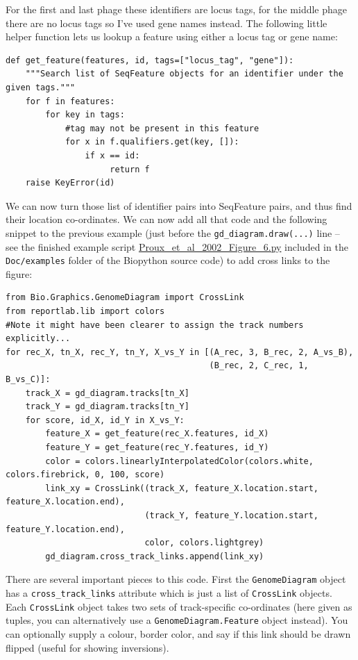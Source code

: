 \documentclass{report}
\begin{document}
For the first and last phage these identifiers are locus tags, for the middle
phage there are no locus tags so I've used gene names instead. The following
little helper function lets us lookup a feature using either a locus tag or
gene name:

\begin{verbatim}
def get_feature(features, id, tags=["locus_tag", "gene"]):
    """Search list of SeqFeature objects for an identifier under the given tags."""
    for f in features:
        for key in tags:
            #tag may not be present in this feature 
            for x in f.qualifiers.get(key, []):
                if x == id:
                     return f
    raise KeyError(id)
\end{verbatim}

We can now turn those list of identifier pairs into SeqFeature pairs, and thus
find their location co-ordinates. We can now add all that code and the following
snippet to the previous example (just before the \verb|gd_diagram.draw(...)|
line -- see the finished example script
\href{http://biopython.org/SRC/biopython/Doc/examples/Proux_et_al_2002_Figure_6.py}{Proux\_et\_al\_2002\_Figure\_6.py}
included in the \texttt{Doc/examples} folder of the Biopython source code)
to add cross links to the figure:

\begin{verbatim}
from Bio.Graphics.GenomeDiagram import CrossLink
from reportlab.lib import colors
#Note it might have been clearer to assign the track numbers explicitly...                                                          
for rec_X, tn_X, rec_Y, tn_Y, X_vs_Y in [(A_rec, 3, B_rec, 2, A_vs_B),
                                         (B_rec, 2, C_rec, 1, B_vs_C)]:
    track_X = gd_diagram.tracks[tn_X]
    track_Y = gd_diagram.tracks[tn_Y]
    for score, id_X, id_Y in X_vs_Y:
        feature_X = get_feature(rec_X.features, id_X)
        feature_Y = get_feature(rec_Y.features, id_Y)
        color = colors.linearlyInterpolatedColor(colors.white, colors.firebrick, 0, 100, score)
        link_xy = CrossLink((track_X, feature_X.location.start, feature_X.location.end),
                            (track_Y, feature_Y.location.start, feature_Y.location.end),
                            color, colors.lightgrey)
        gd_diagram.cross_track_links.append(link_xy)
\end{verbatim}

There are several important pieces to this code. First the \verb|GenomeDiagram| object
has a \verb|cross_track_links| attribute which is just a list of \verb|CrossLink| objects.
Each \verb|CrossLink| object takes two sets of track-specific co-ordinates (here given
as tuples, you can alternatively use a \verb|GenomeDiagram.Feature| object instead).
You can optionally supply a colour, border color, and say if this link should be drawn
flipped (useful for showing inversions).
\end{document}
